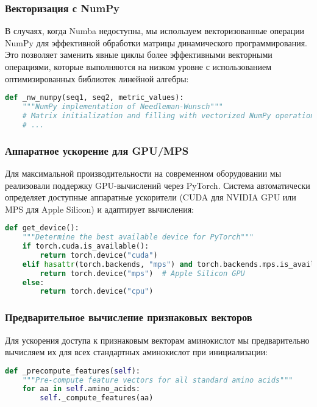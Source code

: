 \documentclass[12pt]{article}
\begin{document}
\subsubsection{Векторизация с NumPy}

В случаях, когда Numba недоступна, мы используем векторизованные операции NumPy для эффективной обработки матрицы динамического программирования. Это позволяет заменить явные циклы более эффективными векторными операциями, которые выполняются на низком уровне с использованием оптимизированных библиотек линейной алгебры:

\begin{lstlisting}[language=Python]
def _nw_numpy(seq1, seq2, metric_values):
    """NumPy implementation of Needleman-Wunsch"""
    # Matrix initialization and filling with vectorized NumPy operations
    # ...
\end{lstlisting}

\subsubsection{Аппаратное ускорение для GPU/MPS}

Для максимальной производительности на современном оборудовании мы реализовали поддержку GPU-вычислений через PyTorch. Система автоматически определяет доступные аппаратные ускорители (CUDA для NVIDIA GPU или MPS для Apple Silicon) и адаптирует вычисления:

\begin{lstlisting}[language=Python]
def get_device():
    """Determine the best available device for PyTorch"""
    if torch.cuda.is_available():
        return torch.device("cuda")
    elif hasattr(torch.backends, "mps") and torch.backends.mps.is_available():
        return torch.device("mps")  # Apple Silicon GPU
    else:
        return torch.device("cpu")
\end{lstlisting}

\subsubsection{Предварительное вычисление признаковых векторов}

Для ускорения доступа к признаковым векторам аминокислот мы предварительно вычисляем их для всех стандартных аминокислот при инициализации:

\begin{lstlisting}[language=Python]
def _precompute_features(self):
    """Pre-compute feature vectors for all standard amino acids"""
    for aa in self.amino_acids:
        self._compute_features(aa)
\end{lstlisting}
\end{document}
